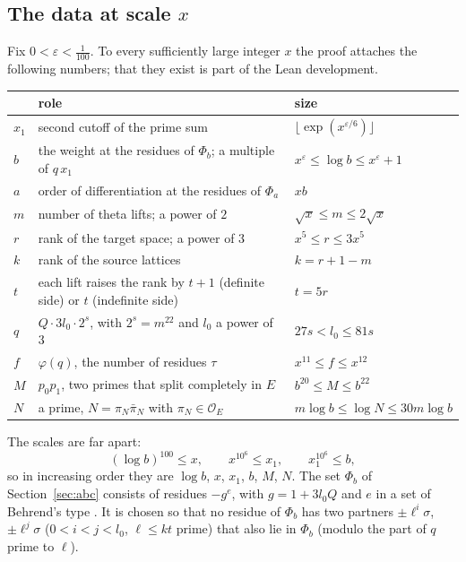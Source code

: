 \documentclass[11pt]{amsart}
\numberwithin{equation}{section}
\theoremstyle{definition}
\theoremstyle{remark}
\newcommand{\cO}{\mathcal O}
\begin{document}
\subsection*{The data at scale $x$}
Fix $0<\varepsilon<\frac1{100}$. To every sufficiently large integer $x$ the proof attaches the following numbers; that they exist is part of the Lean development.
\begin{center}\small
\begin{tabular}{@{}l p{} p{}@{}}
\toprule
 & role & size\\
\midrule
$x_1$ & second cutoff of the prime sum & $\lfloor\exp(x^{\varepsilon/6})\rfloor$\\
$b$ & the weight at the residues of $\Phi_b$; a multiple of $q\,x_1$ & $x^\varepsilon\le\log b\le x^\varepsilon+1$\\
$a$ & order of differentiation at the residues of $\Phi_a$ & $xb$\\
$m$ & number of theta lifts; a power of $2$ & $\sqrt x\le m\le2\sqrt x$\\
$r$ & rank of the target space; a power of $3$ & $x^5\le r\le3x^5$\\
$k$ & rank of the source lattices & $k=r+1-m$\\
$t$ & each lift raises the rank by $t+1$ (definite side) or $t$ (indefinite side) & $t=5r$\\
$q$ & $Q\cdot3l_0\cdot2^s$, with $2^s=m^{22}$ and $l_0$ a power of $3$ & $27s<l_0\le81s$\\
$f$ & $\varphi(q)$, the number of residues $\tau$ & $x^{11}\le f\le x^{12}$\\
$M$ & $p_0p_1$, two primes that split completely in $E$ & $b^{20}\le M\le b^{22}$\\
$N$ & a prime, $N=\pi_N\bar\pi_N$ with $\pi_N\in\cO_E$ & $m\log b\le\log N\le30m\log b$\\
\bottomrule
\end{tabular}
\end{center}
The scales are far apart:
\begin{equation}
 (\log b)^{100}\le x,\qquad x^{10^6}\le x_1,\qquad x_1^{10^6}\le b,
\end{equation}
so in increasing order they are $\log b$, $x$, $x_1$, $b$, $M$, $N$. The set $\Phi_b$ of Section~\ref{sec:abc} consists of residues $-g^e$, with $g=1+3l_0Q$ and $e$ in a set of Behrend's type \cite{behrend,shapira}. It is chosen so that no residue of $\Phi_b$ has two partners $\pm\ell^i\sigma$, $\pm\ell^j\sigma$ ($0<i<j<l_0$, $\ell\le kt$ prime) that also lie in $\Phi_b$ (modulo the part of $q$ prime to $\ell$).
\end{document}
